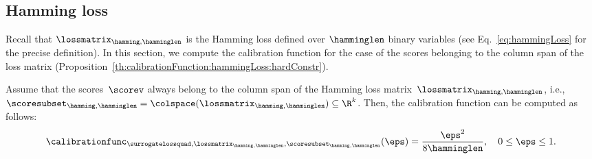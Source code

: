 \documentclass{article}
\begin{document}
\subsection{Hamming loss}
\label{sec:exactTranferProofs:hamming}
Recall that $\lossmatrix_{\hamming,\hamminglen}$ is the Hamming loss defined over $\hamminglen$ binary variables (see Eq.~\eqref{eq:hammingLoss} for the precise definition).
In this section, we compute the calibration function for the case of the scores belonging to the column span of the loss matrix (Proposition~\ref{th:calibrationFunction:hammingLoss:hardConstr}).

%

%
%
%
%
%
%
%
%
%
%
%
%
%
%

\begin{proposition}
    \label{th:calibrationFunction:hammingLoss:hardConstr}
    Assume that the scores~$\scorev$ always belong to the column span of the Hamming loss matrix~$\lossmatrix_{\hamming,\hamminglen}$, i.e., $\scoresubset_{\hamming,\hamminglen} = \colspace(\lossmatrix_{\hamming,\hamminglen}) \subseteq \R^k$.
    Then, the calibration function can be computed as follows:
    \[
    \calibrationfunc_{\surrogatelossquad,\lossmatrix_{\hamming,\hamminglen},\scoresubset_{\hamming,\hamminglen}}(\eps)
    =
    \frac{\eps^2}{8\hamminglen}, \quad 0 \leq \eps \leq 1.
    \]
\end{proposition}
\end{document}
